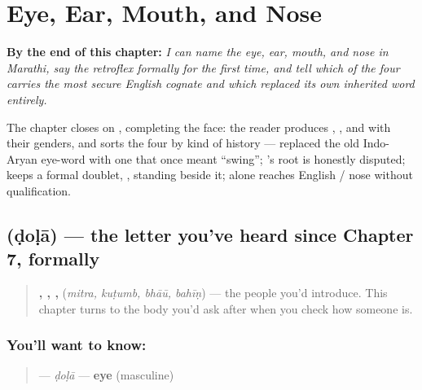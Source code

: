 
\chapter{Eye, Ear, Mouth, and Nose}
\label{ch:mr-face-parts}

\begin{chapteropening}
\textbf{By the end of this chapter:} \emph{I can name the eye, ear, mouth, and nose in Marathi, say the retroflex  formally for the first time, and tell which of the four carries the most secure English cognate and which replaced its own inherited word entirely.}

The chapter closes on , completing the face: the reader produces , ,  and  with their genders, and sorts the four by kind of history —  replaced the old Indo-Aryan eye-word with one that once meant \textquotedblleft{}swing\textquotedblright{}; 's root is honestly disputed;  keeps a formal doublet, , standing beside it;  alone reaches English  / nose without qualification.
\end{chapteropening}

\section[ḍoḷā]{ (ḍoḷā) — the letter you've heard since Chapter 7, formally}

\label{lesson:MR-C12-dola}



\begin{quote}
\textbf{, , , } (\emph{mitra, kuṭumb, bhāū, bahīṇ}) — the people you'd introduce. This chapter turns to the body you'd ask after when you check how someone is.
\end{quote}

\subsection*{You'll want to know: }
\begin{quote}
\textbf{} — \emph{ḍoḷā} — \textbf{eye} (masculine)
\end{quote}

